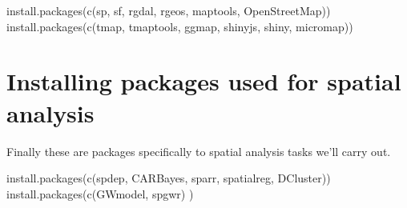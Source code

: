 \documentclass[
]{book}
\newenvironment{Shaded}{\begin{snugshade}}{\end{snugshade}}
\newcommand{\FunctionTok}[1]{\textcolor[rgb]{0.00,0.00,0.00}{#1}}
\newcommand{\NormalTok}[1]{#1}
\newcommand{\StringTok}[1]{\textcolor[rgb]{0.31,0.60,0.02}{#1}}
\begin{document}
\begin{Shaded}
\begin{Highlighting}[]
\FunctionTok{install.packages}\NormalTok{(}\FunctionTok{c}\NormalTok{(}\StringTok{\textquotesingle{}sp\textquotesingle{}}\NormalTok{, }\StringTok{\textquotesingle{}sf\textquotesingle{}}\NormalTok{, }\StringTok{\textquotesingle{}rgdal\textquotesingle{}}\NormalTok{, }\StringTok{\textquotesingle{}rgeos\textquotesingle{}}\NormalTok{, }\StringTok{\textquotesingle{}maptools\textquotesingle{}}\NormalTok{, }\StringTok{\textquotesingle{}OpenStreetMap\textquotesingle{}}\NormalTok{))  }
\FunctionTok{install.packages}\NormalTok{(}\FunctionTok{c}\NormalTok{(}\StringTok{\textquotesingle{}tmap\textquotesingle{}}\NormalTok{, }\StringTok{\textquotesingle{}tmaptools\textquotesingle{}}\NormalTok{, }\StringTok{\textquotesingle{}ggmap\textquotesingle{}}\NormalTok{, }\StringTok{\textquotesingle{}shinyjs\textquotesingle{}}\NormalTok{, }\StringTok{\textquotesingle{}shiny\textquotesingle{}}\NormalTok{, }\StringTok{\textquotesingle{}micromap\textquotesingle{}}\NormalTok{)) }
\end{Highlighting}
\end{Shaded}

\hypertarget{installing-packages-used-for-spatial-analysis}{%
\section*{Installing packages used for spatial analysis}\label{installing-packages-used-for-spatial-analysis}}

Finally these are packages specifically to spatial analysis tasks we'll carry out.

\begin{Shaded}
\begin{Highlighting}[]
\FunctionTok{install.packages}\NormalTok{(}\FunctionTok{c}\NormalTok{(}\StringTok{\textquotesingle{}spdep\textquotesingle{}}\NormalTok{, }\StringTok{\textquotesingle{}CARBayes\textquotesingle{}}\NormalTok{, }\StringTok{\textquotesingle{}sparr\textquotesingle{}}\NormalTok{, }\StringTok{\textquotesingle{}spatialreg\textquotesingle{}}\NormalTok{,  }\StringTok{\textquotesingle{}DCluster\textquotesingle{}}\NormalTok{))}
\FunctionTok{install.packages}\NormalTok{(}\FunctionTok{c}\NormalTok{(}\StringTok{\textquotesingle{}GWmodel\textquotesingle{}}\NormalTok{, }\StringTok{\textquotesingle{}spgwr\textquotesingle{}}\NormalTok{) )}
\end{Highlighting}
\end{Shaded}


  
\end{document}
